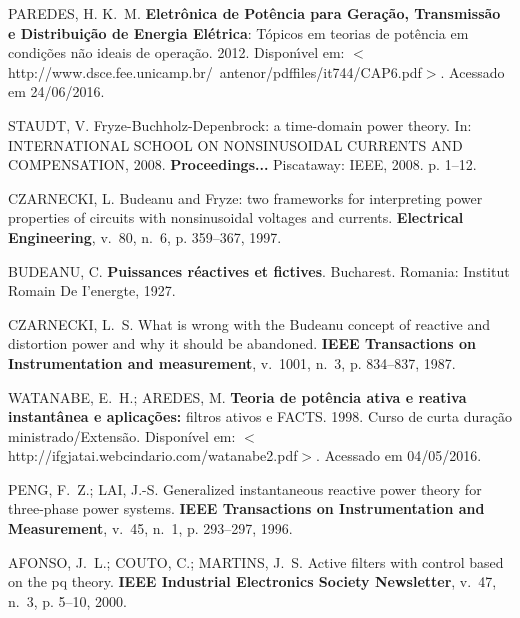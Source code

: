 \begin{thebibliography}{}
{PAREDES, H. K.~M. \textbf{Eletr\^onica de Pot\^encia para Gera\c{c}\~ao,
  Transmiss\~ao e Distribui\c{c}\~ao de Energia El\'etrica}: T\'opicos em
  teorias de pot\^encia em condi\c{c}\~oes n\~ao ideais de opera\c{c}\~ao. 2012.
  Dispon{\'\i}vel em:
  $<$http://www.dsce.fee.unicamp.br/~antenor/pdffiles/it744/CAP6.pdf$>$.}
  Acessado em 24/06/2016.

{STAUDT, V. Fryze-Buchholz-Depenbrock: a time-domain power theory. In:
	\uppercase{International School on Nonsinusoidal Currents and Compensation}, 2008.
	\textbf{Proceedings...} Piscataway: IEEE, 2008. p. 1--12.}

{CZARNECKI, L. Budeanu and Fryze: two frameworks for interpreting power
  properties of circuits with nonsinusoidal voltages and currents.
\textbf{Electrical Engineering}, v.~80, n.~6, p. 359--367, 1997.}

{BUDEANU, C. \textbf{Puissances r{\'e}actives et fictives}.
	Bucharest. Romania: Institut Romain De I'energte, 1927.}

{CZARNECKI, L.~S. What is wrong with the Budeanu concept of reactive and
  distortion power and why it should be abandoned.
\textbf{IEEE Transactions on Instrumentation and measurement}, v.~1001,
  n.~3, p. 834--837, 1987.}

{WATANABE, E.~H.; AREDES, M. \textbf{Teoria de pot\^encia ativa e reativa
  instant\^anea e aplica{\c{c}}{\~o}es:} filtros ativos e FACTS. 1998. 
  Curso de curta dura{\c{c}}{\~a}o ministrado/Extens{\~a}o. Dispon\'ivel em:
  $<$http://ifgjatai.webcindario.com/watanabe2.pdf$>$. 
  Acessado em 04/05/2016.}

{PENG, F.~Z.; LAI, J.-S. Generalized instantaneous reactive power theory for
  three-phase power systems.
\textbf{IEEE Transactions on Instrumentation and Measurement}, v.~45, n.~1,
  p. 293--297, 1996.}

{AFONSO, J.~L.; COUTO, C.; MARTINS, J.~S. Active filters with control based on
  the pq theory.
\textbf{IEEE Industrial Electronics Society Newsletter}, v.~47, n.~3, p.
  5--10, 2000.}


\end{thebibliography}
